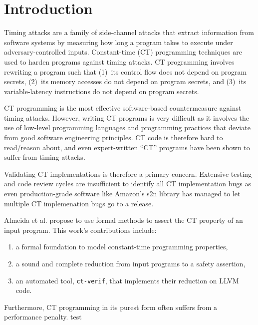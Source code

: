 \section{Introduction}

Timing attacks are a family of side-channel attacks that extract information from software systems by measuring how long a program takes to execute under adversary-controlled inputs.
Constant-time (CT) programming techniques are used to harden programs against timing attacks.
CT programming involves rewriting a program such that (1)~its control flow does not depend on program secrets, (2)~its memory accesses do not depend on program secrets, and (3)~its variable-latency instructions do not depend on program secrets.

CT programming is the most effective software-based countermeasure against timing attacks.
However, writing CT programs is very difficult as it involves the use of low-level programming languages and programming practices that deviate from good software engineering principles.
CT code is therefore hard to read/reason about, and even expert-written ``CT'' programs have been shown to suffer from timing attacks.

Validating CT implementations is therefore a primary concern.
Extensive testing and code review cycles are insufficient to identify all CT implementation bugs as even production-grade software like Amazon's s2n library has managed to let multiple CT implemenation bugs go to a release.

Almeida et al. propose to use formal methods to assert the CT property of an input program.
This work's contributions include:
\begin{enumerate}[label=(\roman*)]
  \item a formal foundation to model constant-time programming properties,
  \item a sound and complete reduction from input programs to a safety assertion,
  \item an automated tool, \texttt{ct-verif}, that implements their reduction on LLVM code.
\end{enumerate}

Furthermore, CT programming in its purest form often suffers from a performance penalty.
test
